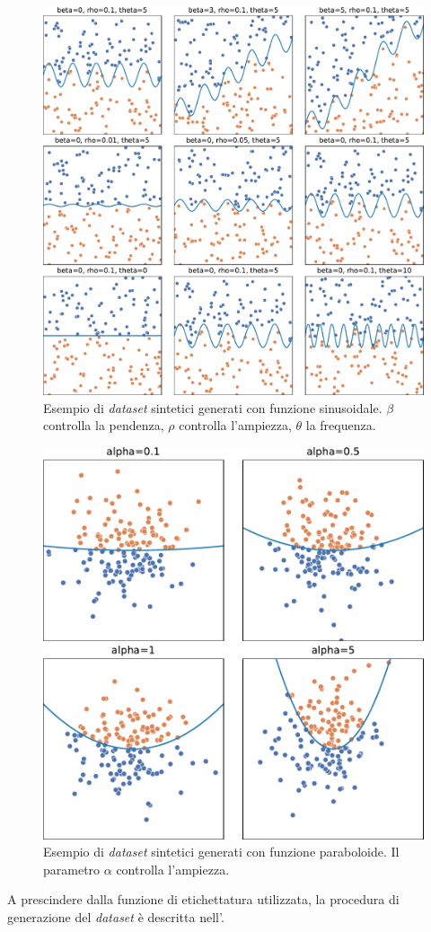 \begin{figure}
    \centering
    \includegraphics[width=.7\linewidth]{img/sinusoid_dataset_param_influence.pdf}
    \caption[Esempio di \emph{dataset} sintetici generati con funzione sinusoidale.]{Esempio di \emph{dataset} sintetici generati con funzione sinusoidale. 
    $\beta$ controlla la pendenza, $\rho$ controlla l'ampiezza, $\theta$ la frequenza.}
    \label{fig:sinusoid_dataset}
\end{figure}
\begin{figure}
    \centering
    \includegraphics[width=.5\linewidth]{img/pacman_dataset_param_influence.pdf}
    \caption[Esempio di \emph{dataset} sintetici generati con funzione paraboloide.]{Esempio di \emph{dataset} sintetici generati con funzione paraboloide. Il parametro $\alpha$ controlla l'ampiezza.}
    \label{fig:pacman_dataset}
\end{figure}
A prescindere dalla funzione di etichettatura utilizzata, la procedura di generazione del \emph{dataset} è descritta nell'.
